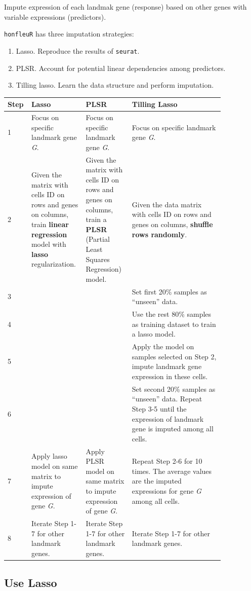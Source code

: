 \documentclass[]{article}
\providecommand{\tightlist}{%
  \setlength{\itemsep}{0pt}\setlength{\parskip}{0pt}}
\begin{document}
Impute expression of each landmak gene (response) based on other genes
with variable expressions (predictors).

\texttt{honfleuR} has three imputation strategies:

\begin{enumerate}
\def\labelenumi{\arabic{enumi}.}
\tightlist
\item
  Lasso. Reproduce the results of \texttt{seurat}.
\item
  PLSR. Account for potential linear dependencies among predictors.
\item
  Tilling lasso. Learn the data structure and perform imputation.
\end{enumerate}

\begin{longtable}[l]{p{0.05\linewidth} *{2}{p{0.2\linewidth}} p{0.4\linewidth} }
\toprule
Step & Lasso & PLSR & Tilling Lasso\tabularnewline
\midrule
\endhead
1 & Focus on specific landmark gene \emph{G}. & Focus on specific
landmark gene \emph{G}. & Focus on specific landmark gene
\emph{G}.\tabularnewline
2 & Given the matrix with cells ID on rows and genes on columns, train
\textbf{linear regression} model with \textbf{lasso} regularization. &
Given the matrix with cells ID on rows and genes on columns, train a
\textbf{PLSR} (Partial Least Squares Regression) model. & Given the data
matrix with cells ID on rows and genes on columns, \textbf{shuffle rows
randomly}.\tabularnewline
3 & & & Set first 20\% samples as ``unseen'' data.\tabularnewline
4 & & & Use the rest 80\% samples as training dataset to train a lasso
model.\tabularnewline
5 & & & Apply the model on samples selected on Step 2, impute landmark
gene expression in these cells.\tabularnewline
6 & & & Set second 20\% samples as ``unseen'' data. Repeat Step 3-5
until the expression of landmark gene is imputed among all
cells.\tabularnewline
7 & Apply lasso model on same matrix to impute expression of gene
\emph{G}. & Apply PLSR model on same matrix to impute expression of gene
\emph{G}. & Repeat Step 2-6 for 10 times. The average values are the
imputed expressions for gene \emph{G} among all cells.\tabularnewline
8 & Iterate Step 1-7 for other landmark genes. & Iterate Step 1-7 for
other landmark genes. & Iterate Step 1-7 for other landmark
genes.\tabularnewline
\bottomrule
\end{longtable}

\subsection{Use Lasso}\label{use-lasso}
\end{document}
